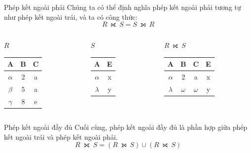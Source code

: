 \documentclass[11pt, handout]{beamer}
\begin{document}
  \begin{frame}{Phép kết ngoài phải}
    Chúng ta có thể định nghĩa phép kết ngoài phải tương tự như phép kết ngoài trái, 
    và ta có công thức:
    $$R~⟖~S = S~⟕~R$$
  \end{frame}
  \begin{frame}
    \begin{columns}[T]
      \begin{column}{0.3\textwidth}
        \centering $R$
        \medskip \\
        \begin{tabular}{|c|c|c|}
          \hline
          \textbf{A} & \textbf{B} & \textbf{C}  \\[0.5ex] \hline\hline
          $\alpha$ & 2 & a\\ \hline
          $\beta$ & 5 & a\\ \hline
          $\gamma$ & 8 & e\\ \hline
        \end{tabular}
      \end{column}
      \begin{column}{0.3\textwidth}
        \centering $S$
        \medskip \\
        \begin{tabular}{|c|c|}
          \hline
          \textbf{A} & \textbf{E} \\[0.5ex] \hline\hline
          $\alpha$ & x\\ \hline
          $\lambda$ & y\\ \hline
        \end{tabular}
      \end{column}
      \begin{column}{0.3\textwidth}
        \centering $R~⟖~S$
        \medskip \\
        \begin{tabular}{|c|c|c|c|}
          \hline
          \textbf{A} & \textbf{B} & \textbf{C} & \textbf{E}\\[0.5ex] \hline\hline
          $\alpha$ & 2 & a & x\\ \hline
          $\lambda$ & \cellcolor{blue!25}$\omega$ & \cellcolor{blue!25}$\omega$ & y \\ \hline
        \end{tabular}
      \end{column}
    \end{columns}
  \end{frame}
  \begin{frame}{Phép kết ngoài đầy đủ}
    Cuối cùng, phép kết ngoài đầy đủ là phần hợp giữa phép kết ngoài trái và phép kết ngoài phải.
    $$
    R~⟗~S = (R~⟕~S) \cup (R~⟖~S)
    $$
  \end{frame}
\end{document}
